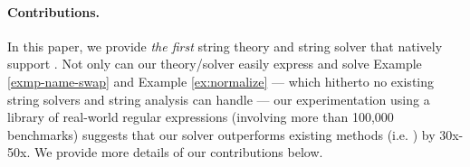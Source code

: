 {%
}



\paragraph*{Contributions.}
In this paper, we provide \emph{the first} string theory and string solver that
natively support \regexp{}. Not only can our theory/solver easily express and 
solve Example
\ref{exmp-name-swap} and Example \ref{ex:normalize} --- which hitherto no 
existing string solvers and string analysis can handle --- our experimentation
using a library of real-world regular expressions (involving more than 100,000
benchmarks) suggests that our solver outperforms existing methods (i.e.
\cite{aratha,LMK19}) by 30x-50x.  We provide more details of our contributions
below.

